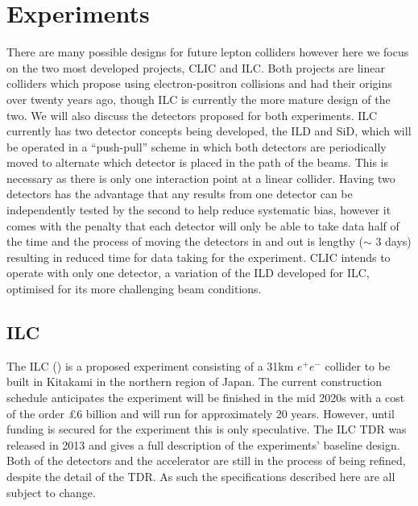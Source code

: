 \chapter{Experiments}
\label{experiments}
There are many possible designs for future lepton colliders \cite{Lipton:2012du,Koratzinos:2014cla,CEPC-SPPCStudyGroup:2015csa} however here we focus on the two most developed projects, \ac{CLIC} and \ac{ILC}. Both projects are linear colliders which propose using electron-positron collisions and had their origins over twenty years ago, though \ac{ILC} is currently the more mature design of the two. We will also discuss the detectors proposed for both experiments. \ac{ILC} currently has two detector concepts being developed, the \ac{ILD} and \ac{SiD}, which will be operated in a ``push-pull'' scheme in which both detectors are periodically moved to alternate which detector is placed in the path of the beams. This is necessary as there is only one interaction point at a linear collider. Having two detectors has the advantage that any results from one detector can be independently tested by the second to help reduce systematic bias, however it comes with the penalty that each detector will only be able to take data half of the time and the process of moving the detectors in and out is lengthy ($\sim$ 3 days) resulting in reduced time for data taking for the experiment. \ac{CLIC} intends to operate with only one detector, a variation of the \ac{ILD} developed for \ac{ILC}, optimised for its more challenging beam conditions. 

\section{ILC}

The ILC\cite{ILCTDR} () is a proposed experiment consisting of a 31km ${e^+e^-}$ collider to be built in Kitakami in the northern region of Japan. The current construction schedule anticipates the experiment will be finished in the mid 2020s with a cost of the order \pounds6 billion and will run for approximately 20 years. However, until funding is secured for the experiment this is only speculative. The \ac{ILC} \ac{TDR} \cite{ILCTDR} was released in 2013 and gives a full description of the experiments' baseline design. Both of the detectors and the accelerator are still in the process of being refined, despite the detail of the \ac{TDR}. As such the specifications described here are all subject to change.

